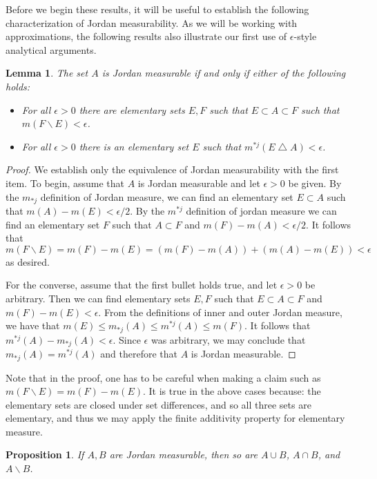 \documentclass[11pt,oneside]{amsbook}
\renewcommand{\setminus}{\smallsetminus}
\renewcommand{\triangle}{\bigtriangleup}
\theoremstyle{definition}
\theoremstyle{plain}
\newtheorem{lem}[thm]{Lemma}
\newtheorem{prop}[thm]{Proposition}
\theoremstyle{definition}
\theoremstyle{remark}
\numberwithin{equation}{section}
\numberwithin{figure}{section}
\begin{document}
Before we begin these results, it will be useful to establish the following characterization of Jordan measurability. As we will be working with approximations, the following results also illustrate our first use of $\epsilon$-style analytical arguments.

\begin{lem}
  \label{lem:jordan-equiv}
  The set $A$ is Jordan measurable if and only if either of the following holds:
  \begin{itemize}
  \item For all $\epsilon>0$ there are elementary sets $E,F$ such that $E\subset A\subset F$ such that $m(F\setminus E)<\epsilon$.
  \item For all $\epsilon>0$ there is an elementary set $E$ such that $m^{*j}(E\triangle A)<\epsilon$.
  \end{itemize}
\end{lem}

\begin{proof}
  We establish only the equivalence of Jordan measurability with the first item. To begin, assume that $A$ is Jordan measurable and let $\epsilon>0$ be given. By the $m_{*j}$ definition of Jordan measure, we can find an elementary set $E\subset A$ such that $m(A)-m(E)<\epsilon/2$. By the $m^{*j}$ definition of jordan measure we can find an elementary set $F$ such that $A\subset F$ and $m(F)-m(A)<\epsilon/2$. It follows that
\[m(F\setminus E)=m(F)-m(E)=(m(F)-m(A))+(m(A)-m(E))<\epsilon
\]
as desired.

  For the converse, assume that the first bullet holds true, and let $\epsilon>0$ be arbitrary. Then we can find elementary sets $E,F$ such that $E\subset A\subset F$ and $m(F)-m(E)<\epsilon$. From the definitions of inner and outer Jordan measure, we have that $m(E)\leq m_{*j}(A)\leq m^{*j}(A)\leq m(F)$. It follows that $m^{*j}(A)-m_{*j}(A)<\epsilon$. Since $\epsilon$ was arbitrary, we may conclude that $m_{*j}(A)=m^{*j}(A)$ and therefore that $A$ is Jordan measurable.
\end{proof}

Note that in the proof, one has to be careful when making a claim such as $m(F\setminus E)=m(F)-m(E)$. It is true in the above cases because: the elementary sets are closed under set differences, and so all three sets are elementary, and thus we may apply the finite additivity property for elementary measure.

\begin{prop}
  \label{prop:jordan-closure}
  If $A,B$ are Jordan measurable, then so are $A\cup B$, $A\cap B$, and $A\setminus B$.
\end{prop}
\end{document}
